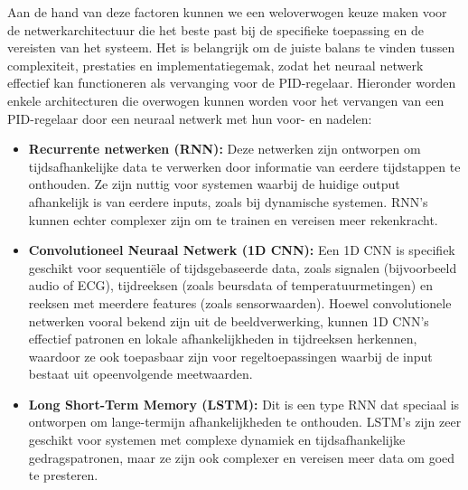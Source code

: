 Aan de hand van deze factoren kunnen we een weloverwogen keuze maken voor de netwerkarchitectuur die het beste past bij de specifieke toepassing en de vereisten van het systeem. Het is belangrijk om de juiste balans te vinden tussen complexiteit, prestaties en implementatiegemak, zodat het neuraal netwerk effectief kan functioneren als vervanging voor de PID-regelaar. Hieronder worden enkele architecturen die overwogen kunnen worden voor het vervangen van een PID-regelaar door een neuraal netwerk met hun voor- en nadelen:
\begin{itemize}  
  \item \textbf{Recurrente netwerken\cite{Haykin2009_recurrent} (RNN):} Deze netwerken zijn ontworpen om tijdsafhankelijke data te verwerken door informatie van eerdere tijdstappen te onthouden. Ze zijn nuttig voor systemen waarbij de huidige output afhankelijk is van eerdere inputs, zoals bij dynamische systemen. RNN's kunnen echter complexer zijn om te trainen en vereisen meer rekenkracht.
  \item \textbf{Convolutioneel Neuraal Netwerk\cite{Haykin2009_convolutional} (1D CNN):} Een 1D CNN is specifiek geschikt voor sequentiële of tijdsgebaseerde data, zoals signalen (bijvoorbeeld audio of ECG), tijdreeksen (zoals beursdata of temperatuurmetingen) en reeksen met meerdere features (zoals sensorwaarden). Hoewel convolutionele netwerken vooral bekend zijn uit de beeldverwerking, kunnen 1D CNN's effectief patronen en lokale afhankelijkheden in tijdreeksen herkennen, waardoor ze ook toepasbaar zijn voor regeltoepassingen waarbij de input bestaat uit opeenvolgende meetwaarden.
  \item \textbf{Long Short-Term Memory (LSTM):} Dit is een type RNN dat speciaal is ontworpen om lange-termijn afhankelijkheden te onthouden. LSTM's zijn zeer geschikt voor systemen met complexe dynamiek en tijdsafhankelijke gedragspatronen, maar ze zijn ook complexer en vereisen meer data om goed te presteren.
\end{itemize}


